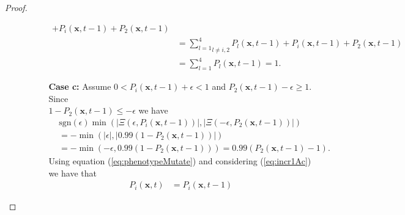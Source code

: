 \documentclass[\main/thesis.tex]{subfiles}
\begin{document}
\begin{proof}
\begin{itemize}
\begin{itemize}
\begin{itemize}
\begin{align*}
                           	                           {+} P_i(\boldsymbol{x}, t{-}1) {+} P_2(\boldsymbol{x}, t{-}1) \\
                           	                          &{=} \underset{l {\ne} i, 2}{\sum_{l{=}1}^4} P_l(\boldsymbol{x},t{-}1) 
                           	                           {+} P_i(\boldsymbol{x}, t{-}1) {+} P_2(\boldsymbol{x}, t{-}1) \\
                           	                          &{=} \sum_{l{=}1}^4 P_l(\boldsymbol{x}, t{-}1) {=} 1.
                           	                        \end{align*}
                               \item[{\bf Case c:}] Assume $0 {<} P_i(\boldsymbol{x}, t{-}1) {+} \epsilon {<} 1$ 
                           	                        and $P_2(\boldsymbol{x}, t{-}1) {-} \epsilon {\ge} 1$. Since\\
                           	                        $1 {-} P_2(\boldsymbol{x}, t{-}1) {\le} {-}\epsilon$ we have 
                                                 	\begin{align*}
                           	                          &\text{sgn}(\epsilon) \min(|\Xi(\epsilon,P_i(\boldsymbol{x},t{-}1))|, 
                           	                                                     |\Xi({-}\epsilon, 
                           	                                                          P_2(\boldsymbol{x},t{-}1))|)
                           	                          \\ 
                           	                          &{=} {-}\min(|\epsilon|, |0.99 (1{-}P_2(\boldsymbol{x}, t{-}1))|) \\
                           	                          &{=} {-} \min({-}\epsilon, 0.99 (1{-}P_2(\boldsymbol{x}, t{-}1))) 
                           	                           {=} 0.99 (P_2(\boldsymbol{x}, t{-}1) {-} 1).
                           	                          \tag{7}
                           	                          \label{eq:incr1Ac}
                           	                        \end{align*}
                           	                        Using equation (\ref{eq:phenotypeMutate}) and considering 
                           	                        (\ref{eq:incr1Ac}) we have that
                           	                        \begin{align*}
                           	                          P_i(\boldsymbol{x}, t) &{=} P_i(\boldsymbol{x}, t{-}1)

\end{align*}
\end{itemize}
\end{itemize}
\end{itemize}
\end{proof}
\end{document}
